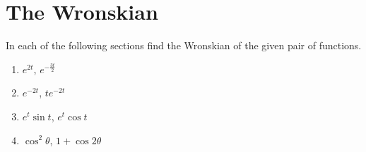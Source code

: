 \documentclass[fleqn, a4paper, 11pt, oneside]{amsart}
\theoremstyle{definition}
\theoremstyle{theorem}
\begin{document}
\part{The Wronskian}

\begin{question}
	In each of the following sections find the Wronskian of the given pair of functions.
	\begin{enumerate}
		\item $e^{2 t}$, $e^{-\frac{3 t}{2}}$
		\item $e^{-2 t}$, $t e^{-2 t}$
		\item $e^t \sin t$, $e^t \cos t$
		\item $\cos^2 \theta$, $1 + \cos 2 \theta$
	\end{enumerate}
\end{question}
\end{document}
